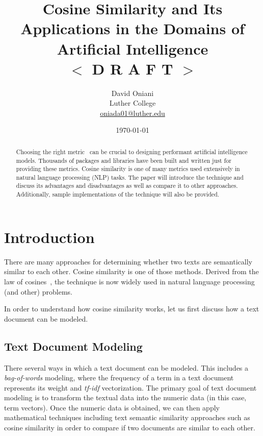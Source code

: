 \documentclass[11pt]{article}
\author{David Oniani\\
        Luther College\\
        \href{mailto:oniada01@luther.edu}{oniada01@luther.edu}}
\title{\textbf{Cosine Similarity and Its Applications in the Domains of
  Artificial Intelligence}\\\color{black!50!blue}$<$ D R A F T $>$}
\date{\today}
\begin{document}
\maketitle


\begin{abstract}
  \noindent Choosing the right metric~\cite{thomas2020} can be crucial to
  designing performant artificial intelligence models. Thousands of packages
  and libraries have been built and written just for providing these metrics.
  Cosine similarity is one of many metrics used extensively in natural language
  processing (NLP) tasks. The paper will introduce the technique and discuss
  its advantages and disadvantages as well as compare it to other approaches.
  Additionally, sample implementations of the technique will also be provided.
\end{abstract}


\section{Introduction}

There are many approaches for determining whether two texts are semantically
similar to each other. Cosine similarity is one of those methods. Derived from
the law of cosines~\cite{wikicosineproof}, the technique is now widely used in
natural language processing (and other) problems.

\bigskip

In order to understand how cosine similarity works, let us first discuss how a
text document can be modeled.

\subsection{Text Document Modeling}

There several ways in which a text document can be modeled. This includes a
\textit{bag-of-words} modeling, where the frequency of a term in a text
document represents its weight and \textit{tf-idf} vectorization. The primary
goal of text document modeling is to transform the textual data into the
numeric data (in this case, term vectors). Once the numeric data is obtained,
we can then apply mathematical techniques including text semantic similarity
approaches such as cosine similarity in order to compare if two documents are
similar to each other.
\end{document}
